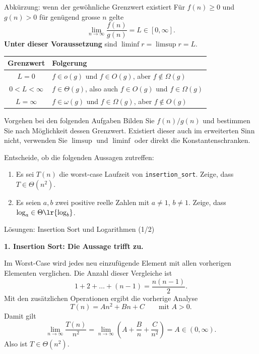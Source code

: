 \begin{frame}{Abkürzung: wenn der gewöhnliche Grenzwert existiert}
	Für $f(n)\geq 0$ und $g(n)>0$ für genügend grosse $n$ gelte
	\[
		\lim_{n\to\infty}\frac{f(n)}{g(n)}=L\in[0,\infty].
	\]
	\textbf{Unter dieser Voraussetzung} sind $\liminf r=\limsup r=L$.
	\begin{center}
		\begin{tabular}{c|l}
			Grenzwert & Folgerung\\
			\hline
			$L=0$ & $f\in o(g)$ und $f\in O(g)$, aber $f\notin\Omega(g)$\\[0.4em]
			$0<L<\infty$ & $f\in\Theta(g)$, also auch $f\in O(g)$ und $f\in\Omega(g)$\\[0.4em]
			$L=\infty$ & $f\in\omega(g)$ und $f\in\Omega(g)$, aber $f\notin O(g)$
		\end{tabular}
	\end{center}
	\begin{block}{Vorgehen bei den folgenden Aufgaben}
		Bilden Sie $f(n)/g(n)$ und bestimmen Sie nach Möglichkeit dessen Grenzwert. Existiert dieser auch im erweiterten Sinn nicht, verwenden Sie $\limsup$ und $\liminf$ oder direkt die Konstantenschranken.
	\end{block}
\end{frame}

\begin{frame}
	\begin{myexercise}\label{myexercise:complexity00}
		Entscheide, ob die folgenden Aussagen zutreffen:
		\begin{enumerate}
			\item Es sei $T(n)$ die worst-case Laufzeit von \texttt{insertion\_sort}. Zeige, dass $T\in\Theta(n^2)$.
			\item Es seien $a, b$ zwei positive reelle Zahlen mit $a\neq 1$, $b\neq 1$. Zeige, dass $\log_a\in\Theta\lr{\log_b}$.
		\end{enumerate}
	\end{myexercise}
\end{frame}

\begin{frame}{Lösungen: Insertion Sort und Logarithmen (1/2)}
	{\small
	\begin{myanswer}
		\textbf{1. Insertion Sort: Die Aussage trifft zu.}

		Im Worst-Case wird jedes neu einzufügende Element mit allen vorherigen Elementen verglichen. Die Anzahl dieser Vergleiche ist
		\[
			1+2+\ldots+(n-1)=\frac{n(n-1)}{2}.
		\]
		Mit den zusätzlichen Operationen ergibt die vorherige Analyse
		\[
			T(n)=An^2+Bn+C\qquad\text{mit }A>0.
		\]
		Damit gilt
		\[
			\lim_{n\to\infty}\frac{T(n)}{n^2}
			=\lim_{n\to\infty}\left(A+\frac{B}{n}+\frac{C}{n^2}\right)=A\in(0,\infty).
		\]
		Also ist $T\in\Theta(n^2)$.
	\end{myanswer}}
\end{frame}

